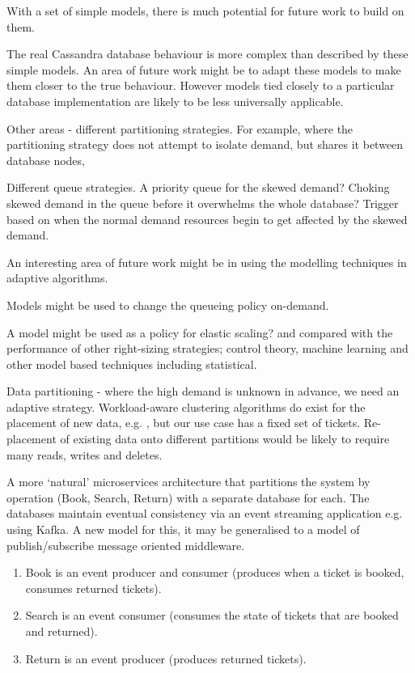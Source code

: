 \begin{shaded}
	
With a set of simple models, there is much potential for future work to build on them.

The real Cassandra database behaviour is more complex than described by these simple models.  An area of future work might be to adapt these models to make them closer to the true behaviour.  However models tied closely to a particular database implementation are likely to be less universally applicable.

Other areas - different partitioning strategies. For example, where the partitioning strategy does not attempt to isolate demand, but shares it between database nodes, 

Different queue strategies.  A priority queue for the skewed demand? Choking skewed demand in the queue before it overwhelms the whole database?  Trigger based on when the normal demand resources begin to get affected by the skewed demand.

An interesting area of future work might be in using the modelling techniques in adaptive algorithms.

Models might be used to change the queueing policy on-demand.

A model might be used as a policy for elastic scaling? and compared with the performance of other right-sizing strategies; control theory, machine learning and other model based techniques including statistical.

Data partitioning - where the high demand is unknown in advance, we need an adaptive strategy.  Workload-aware clustering algorithms do exist for the placement of new data, e.g. \cite{RN63}, but our use case has a fixed set of tickets.  Re-placement of existing data onto different partitions would be likely to require many reads, writes and deletes.

A more `natural' microservices architecture that partitions the system by operation (Book, Search, Return) with a separate database for each.  The databases maintain eventual consistency via an event streaming application e.g. using Kafka.  A new model for this, it may be generalised to a model of publish/subscribe message oriented middleware.
\begin{enumerate}
\item Book is an event producer and consumer (produces when a ticket is booked, consumes returned tickets).
\item Search is an event consumer (consumes the state of tickets that are booked and returned).
\item Return is an event producer (produces returned tickets).
\end{enumerate}

\end{shaded}

